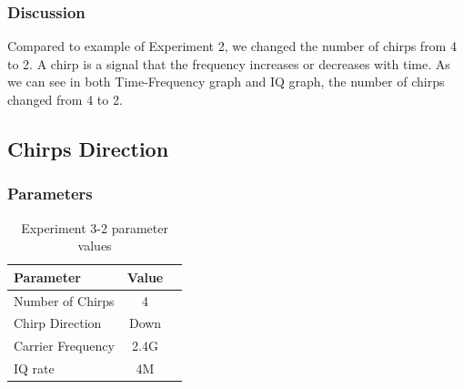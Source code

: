     \subsubsection*{Discussion}
    Compared to example of Experiment 2, we changed the number of chirps from 4 to 2. A chirp is a signal that the frequency increases or decreases with time. As we can see in both Time-Frequency graph and IQ graph, the number of chirps changed from 4 to 2. \\
\clearpage    

    
\subsection{Chirps Direction}
    
    \subsubsection*{Parameters}
    \begin{table}[!h]\centering
        \hspace{10mm}
        \begin{tabular}{|l|c|c|}
        \hline
        \multicolumn{1}{|l|}{Parameter} & \multicolumn{1}{l|}{Value} \\
        \hline
        Number of Chirps & 4 \\ 
        \hline
        Chirp Direction & Down \\ 
        \hline
        Carrier Frequency & 2.4G \\ 
        \hline
        IQ rate & 4M \\ 
        \hline
        \end{tabular}
        \caption{Experiment 3-2 parameter values}
    \end{table}
    
